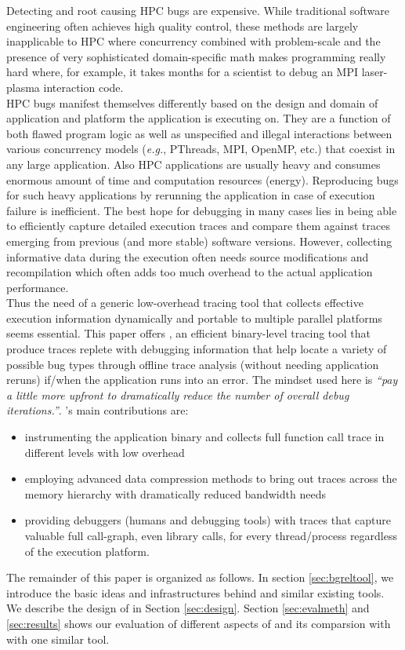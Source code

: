 
Detecting and root causing HPC bugs are expensive. While traditional software engineering often achieves high quality control, these methods are largely inapplicable to HPC where concurrency combined with problem-scale and the presence of very sophisticated domain-specific math makes programming really hard where, for example,  it takes months for a scientist to debug an MPI laser-plasma interaction code\cite{hpcdoe}.\\
HPC bugs manifest themselves differently based on the design and domain of application and platform the application is executing on. They are a function of both flawed program logic as well as unspecified and illegal interactions between various concurrency models ({\em e.g.}, PThreads, MPI, OpenMP, etc.) that coexist in any large application. Also HPC applications are usually heavy and consumes enormous amount of time and computation resources (energy). Reproducing bugs for such heavy applications by rerunning the application in case of execution failure is inefficient. The best hope for debugging in many cases lies in being able to efficiently capture detailed execution traces and compare them against traces emerging from previous (and more stable) software versions\cite{cstg}\cite{stat}. However, collecting informative data during the execution often needs source modifications and recompilation which often adds too much overhead to the actual application performance. \\
Thus the need of a generic low-overhead tracing tool that collects effective execution information dynamically and portable to multiple parallel platforms seems essential.
This paper offers \parlot, an efficient binary-level tracing tool that produce traces replete with debugging information that help locate a variety of possible bug types through offline trace analysis (without needing application reruns) if/when the application runs into an error. The mindset used here is \textit{“pay a little more upfront to dramatically reduce the number of overall debug iterations.”}. \parlot 's main contributions are:
\begin{itemize}
\item instrumenting the application binary and collects full function call trace in different levels with low overhead
\item employing advanced data compression methods to bring out traces across the memory hierarchy with dramatically reduced bandwidth needs
\item providing debuggers (humans and debugging tools) with traces that capture valuable full call-graph, even library calls, for every thread/process regardless of the execution platform.
\end{itemize}
The remainder of this paper is organized as follows. In section \ref{sec:bgreltool}, we introduce the basic ideas and infrastructures behind \parlot and similar existing tools. We describe the design of \parlot in Section \ref{sec:design}. Section \ref{sec:evalmeth} and \ref{sec:results} shows our evaluation of different aspects of \parlot and its comparsion with with one similar tool.
